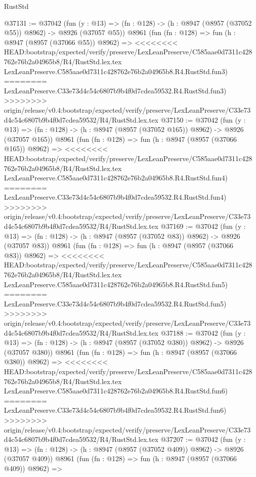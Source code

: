 \begin{lexlean}{RustStd}
\begin{coremodule}
{\begin{coremodule}
{{{{{{{{{{{{{{{{{{{{{{{{{{{{{{{{{{{{{{{@37131 := @37042
    (fun (y : @13) => (fn : @128) -> (h : @8947 (@8957 (@37052 @55)) @8962) -> @8926 (@37057 @55))
    @8961
    (fun (fn : @128) =>
    fun (h : @8947 (@8957 (@37066 @55)) @8962) =>
<<<<<<<< HEAD:bootstrap/expected/verify/preserve/LexLeanPreserve/C585aae0d7311c428762e76b2a04965b8/R4/RustStd.lex.tex
    LexLeanPreserve.C585aae0d7311c428762e76b2a04965b8.R4.RustStd.fun3)
========
    LexLeanPreserve.C33e73d4c54c6807b9b4f0d7cdea59532.R4.RustStd.fun3)
>>>>>>>> origin/release/v0.4:bootstrap/expected/verify/preserve/LexLeanPreserve/C33e73d4c54c6807b9b4f0d7cdea59532/R4/RustStd.lex.tex
@37150 := @37042
    (fun (y : @13) => (fn : @128) -> (h : @8947 (@8957 (@37052 @165)) @8962) -> @8926 (@37057 @165))
    @8961
    (fun (fn : @128) =>
    fun (h : @8947 (@8957 (@37066 @165)) @8962) =>
<<<<<<<< HEAD:bootstrap/expected/verify/preserve/LexLeanPreserve/C585aae0d7311c428762e76b2a04965b8/R4/RustStd.lex.tex
    LexLeanPreserve.C585aae0d7311c428762e76b2a04965b8.R4.RustStd.fun4)
========
    LexLeanPreserve.C33e73d4c54c6807b9b4f0d7cdea59532.R4.RustStd.fun4)
>>>>>>>> origin/release/v0.4:bootstrap/expected/verify/preserve/LexLeanPreserve/C33e73d4c54c6807b9b4f0d7cdea59532/R4/RustStd.lex.tex
@37169 := @37042
    (fun (y : @13) => (fn : @128) -> (h : @8947 (@8957 (@37052 @83)) @8962) -> @8926 (@37057 @83))
    @8961
    (fun (fn : @128) =>
    fun (h : @8947 (@8957 (@37066 @83)) @8962) =>
<<<<<<<< HEAD:bootstrap/expected/verify/preserve/LexLeanPreserve/C585aae0d7311c428762e76b2a04965b8/R4/RustStd.lex.tex
    LexLeanPreserve.C585aae0d7311c428762e76b2a04965b8.R4.RustStd.fun5)
========
    LexLeanPreserve.C33e73d4c54c6807b9b4f0d7cdea59532.R4.RustStd.fun5)
>>>>>>>> origin/release/v0.4:bootstrap/expected/verify/preserve/LexLeanPreserve/C33e73d4c54c6807b9b4f0d7cdea59532/R4/RustStd.lex.tex
@37188 := @37042
    (fun (y : @13) => (fn : @128) -> (h : @8947 (@8957 (@37052 @380)) @8962) -> @8926 (@37057 @380))
    @8961
    (fun (fn : @128) =>
    fun (h : @8947 (@8957 (@37066 @380)) @8962) =>
<<<<<<<< HEAD:bootstrap/expected/verify/preserve/LexLeanPreserve/C585aae0d7311c428762e76b2a04965b8/R4/RustStd.lex.tex
    LexLeanPreserve.C585aae0d7311c428762e76b2a04965b8.R4.RustStd.fun6)
========
    LexLeanPreserve.C33e73d4c54c6807b9b4f0d7cdea59532.R4.RustStd.fun6)
>>>>>>>> origin/release/v0.4:bootstrap/expected/verify/preserve/LexLeanPreserve/C33e73d4c54c6807b9b4f0d7cdea59532/R4/RustStd.lex.tex
@37207 := @37042
    (fun (y : @13) => (fn : @128) -> (h : @8947 (@8957 (@37052 @409)) @8962) -> @8926 (@37057 @409))
    @8961
    (fun (fn : @128) =>
    fun (h : @8947 (@8957 (@37066 @409)) @8962) =>
}}}}}}}}}}}}}}}}}}}}}}}}}}}}}}}}}}}}}}}
\end{coremodule}}
\end{coremodule}
\end{lexlean}
